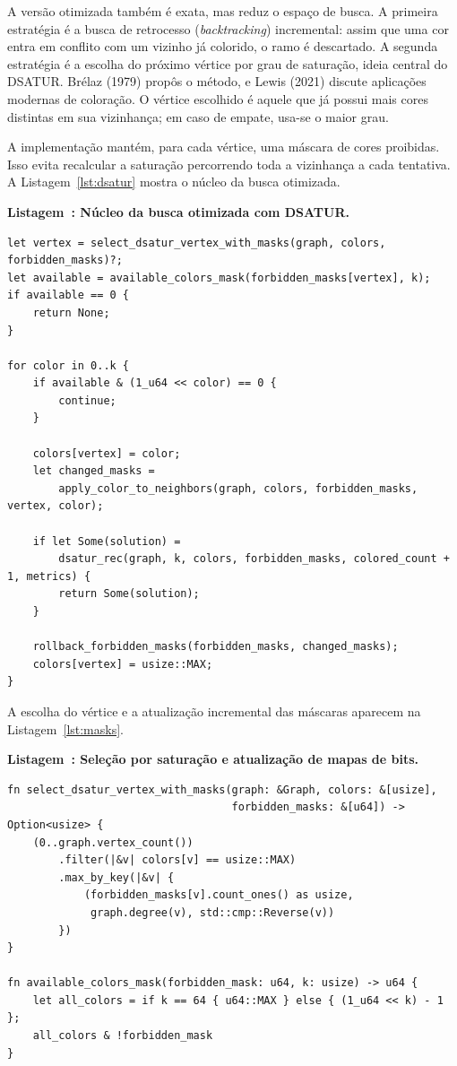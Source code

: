 \documentclass[12pt]{article}
\renewcommand{\listingscaption}{Listagem}
\newcommand{\codetitle}[2]{%
  \refstepcounter{listing}\label{#1}%
  \noindent\textbf{\listingscaption~\thelisting: #2}\par\nopagebreak
  \vspace{0.25\baselineskip}%
}
\begin{document}
A versão otimizada também é exata, mas reduz o espaço de busca. A primeira
estratégia é a busca de retrocesso (\textit{backtracking}) incremental: assim
que uma cor entra em conflito com um vizinho já colorido, o ramo é descartado. A
segunda estratégia é a escolha do próximo vértice por grau de saturação, ideia
central do DSATUR. Brélaz (1979)
propôs o método, e Lewis (2021) discute aplicações modernas de coloração. O
vértice escolhido é aquele que já possui mais
cores distintas em sua vizinhança; em caso de empate, usa-se o maior grau.

A implementação mantém, para cada vértice, uma máscara de cores proibidas. Isso
evita recalcular a saturação percorrendo toda a vizinhança a cada tentativa. A
Listagem~\ref{lst:dsatur} mostra o núcleo da busca otimizada.

\clearpage
\codetitle{lst:dsatur}{Núcleo da busca otimizada com DSATUR.}
\begin{verbatim}
let vertex = select_dsatur_vertex_with_masks(graph, colors, forbidden_masks)?;
let available = available_colors_mask(forbidden_masks[vertex], k);
if available == 0 {
    return None;
}

for color in 0..k {
    if available & (1_u64 << color) == 0 {
        continue;
    }

    colors[vertex] = color;
    let changed_masks =
        apply_color_to_neighbors(graph, colors, forbidden_masks, vertex, color);

    if let Some(solution) =
        dsatur_rec(graph, k, colors, forbidden_masks, colored_count + 1, metrics) {
        return Some(solution);
    }

    rollback_forbidden_masks(forbidden_masks, changed_masks);
    colors[vertex] = usize::MAX;
}
\end{verbatim}

A escolha do vértice e a atualização incremental das máscaras aparecem na
Listagem~\ref{lst:masks}.

\codetitle{lst:masks}{Seleção por saturação e atualização de mapas de bits.}
\begin{verbatim}
fn select_dsatur_vertex_with_masks(graph: &Graph, colors: &[usize],
                                   forbidden_masks: &[u64]) -> Option<usize> {
    (0..graph.vertex_count())
        .filter(|&v| colors[v] == usize::MAX)
        .max_by_key(|&v| {
            (forbidden_masks[v].count_ones() as usize,
             graph.degree(v), std::cmp::Reverse(v))
        })
}

fn available_colors_mask(forbidden_mask: u64, k: usize) -> u64 {
    let all_colors = if k == 64 { u64::MAX } else { (1_u64 << k) - 1 };
    all_colors & !forbidden_mask
}
\end{verbatim}
\end{document}
